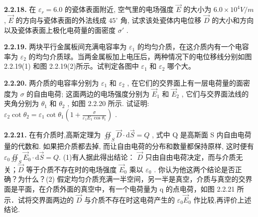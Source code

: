 \vfill
\newpage

\textbf{2.2.18.} 在 $\varepsilon_{r}=6.0$ 的瓷体表面附近, 空气里的电场强度 $\vec{E}$ 的大小为 $6.0\times10^{4}V/m$ , $\vec{E}$ 的方向与瓷体表面的外法线成 $45^{\circ}$ 角, 试求该处瓷体内电位移 $\vec{D}$ 的大小和方向以及瓷体表面上极化电荷量的面密度 $\sigma'$ .

\vfill
\newpage

\textbf{2.2.19.} 两块平行金属板间充满电容率为 $\varepsilon_{1}$ 的均匀介质，在这介质内有一个电容率为 $\varepsilon_{2}$ 的均匀介质球。当两金属板加上电压后，两种情况下的电位移线分别如图 2.2.19(1) 和图 2.2.19(2)所示。试判定各图中 $\varepsilon_{1}$ 和 $\varepsilon_{2}$ 哪个大。

\begin{center}
  \begin{minipage}[b]{0.47\linewidth}
    \centering
  \end{minipage}\hfill
  \begin{minipage}[b]{0.47\linewidth}
    \centering
  \end{minipage}
\end{center}

\vfill
\newpage

\textbf{2.2.20.} 两介质的电容率分别为 $\varepsilon_{1}$ 和 $\varepsilon_{2}$ , 在它们的交界面上有一层电荷量的面密度为 $\sigma$ 的自由电荷; 这面两边的电场强度分别为 $\vec{E}_{1}$ 和 $\vec{E}_{2}$ , 它们与交界面法线的夹角分别为 $\theta_{1}$ 和 $\theta_{2}$ , 如图 2.2.20 所示. 试证明: $\displaystyle \varepsilon_{2} \cot \theta_{2} = \varepsilon_{1} \cot \theta_{1} \left(1 + \frac{\sigma}{\varepsilon_{1} E_{1} \cos \theta_{1}}\right)$ .

\vfill
\newpage

\textbf{2.2.21.} 在有介质时,高斯定理为 $\displaystyle \oiint_{S} \vec{D} \cdot \mathrm{d}\vec{S} = Q$ , 式中 Q 是高斯面 S 内自由电荷量的代数和. 如果把介质都去掉, 而让自由电荷的分布和数量都保持原样, 这时便有 $\displaystyle \varepsilon_0\oiint_{S}\vec{E}_0\cdot \mathrm{d}\vec{S} = Q.$ (1)有人据此得出结论： $\vec{D}$ 只由自由电荷决定，而与介质无关；$\vec{D}$ 等于介质不存在时的电场强度 $\vec{E}_{0}$ 乘以 $\varepsilon_{0}$ . 你认为他这两个结论是否正确？为什么？(2) 假定均匀介质充满一半空间，另一半是真空，介质与真空的交界面是平面，在介质外面的真空中，有一个电荷量为 q 的点电荷，如图 2.2.21 所示．试将交界面两边的 $\vec{D}$ 与介质不存在时这电荷产生的 $\varepsilon_{0}\vec{E}_{0}$ 作比较,再评价上述结论.

